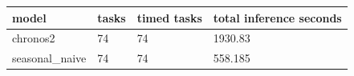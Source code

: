 \begin{tabular}{llll}
\toprule
model & tasks & timed tasks & total inference seconds \\
\midrule
chronos2 & 74 & 74 & 1930.83 \\
seasonal\_naive & 74 & 74 & 558.185 \\
\bottomrule
\end{tabular}
